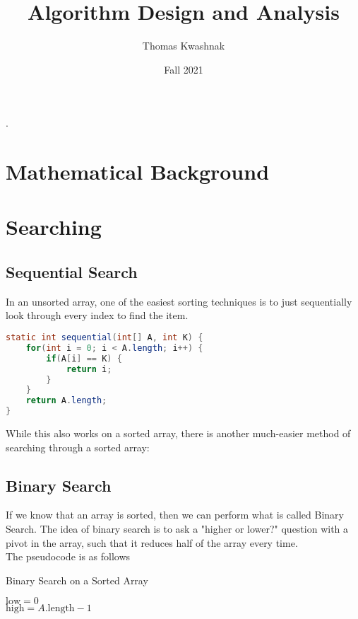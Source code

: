 \documentclass[10pt]{article}
\title{Algorithm Design and Analysis}
\date{Fall 2021}
\author{Thomas Kwashnak}
\begin{document}
\maketitle
\setlength{\parindent}{0pt}.
\setlength{\parskip}{\baselineskip}
\newpage
\tableofcontents
\newpage


\section{Mathematical Background}
\newpage
\section{Searching}
\subsection{Sequential Search}
In an unsorted array, one of the easiest sorting techniques is to just sequentially look through every index to find the item. 
\begin{lstlisting}[language=java]
static int sequential(int[] A, int K) {
    for(int i = 0; i < A.length; i++) {
        if(A[i] == K) {
            return i;
        }
    }
    return A.length;
}
\end{lstlisting}
While this also works on a sorted array, there is another much-easier method of searching through a sorted array:
\subsection{Binary Search}
If we know that an array is sorted, then we can perform what is called Binary Search. The idea of binary search is to ask a "higher or lower?" question with a pivot in the array, such that it reduces half of the array every time.\\
The pseudocode is as follows
\begin{algorithm}
    \caption{Binary Search on a Sorted Array}
    $\text{low} = 0$\\
    $\text{high} = A.\text{length} - 1$\\
\end{algorithm}
\newpage
\end{document}
